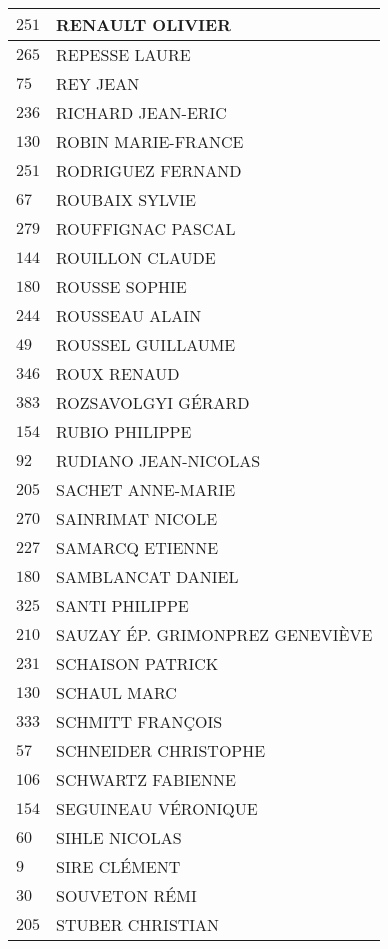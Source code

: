 \begin{xltabular}{\linewidth}{|l|X|}
    \hline
    $251$ & RENAULT OLIVIER \\
    \hline
    $265$ & REPESSE LAURE \\
    \hline
    $75$ & REY JEAN \\
    \hline
    $236$ & RICHARD JEAN-ERIC \\
    \hline
    $130$ & ROBIN MARIE-FRANCE \\
    \hline
    $251$ & RODRIGUEZ FERNAND \\
    \hline
    $67$ & ROUBAIX SYLVIE \\
    \hline
    $279$ & ROUFFIGNAC PASCAL \\
    \hline
    $144$ & ROUILLON CLAUDE \\
    \hline
    $180$ & ROUSSE SOPHIE \\
    \hline
    $244$ & ROUSSEAU ALAIN \\
    \hline
    $49$ & ROUSSEL GUILLAUME \\
    \hline
    $346$ & ROUX RENAUD \\
    \hline
    $383$ & ROZSAVOLGYI GÉRARD \\
    \hline
    $154$ & RUBIO PHILIPPE \\
    \hline
    $92$ & RUDIANO JEAN-NICOLAS \\
    \hline
    $205$ & SACHET ANNE-MARIE \\
    \hline
    $270$ & SAINRIMAT NICOLE \\
    \hline
    $227$ & SAMARCQ ETIENNE \\
    \hline
    $180$ & SAMBLANCAT DANIEL \\
    \hline
    $325$ & SANTI PHILIPPE \\
    \hline
    $210$ & SAUZAY ÉP. GRIMONPREZ GENEVIÈVE \\
    \hline
    $231$ & SCHAISON PATRICK \\
    \hline
    $130$ & SCHAUL MARC \\
    \hline
    $333$ & SCHMITT FRANÇOIS \\
    \hline
    $57$ & SCHNEIDER CHRISTOPHE \\
    \hline
    $106$ & SCHWARTZ FABIENNE \\
    \hline
    $154$ & SEGUINEAU VÉRONIQUE \\
    \hline
    $60$ & SIHLE NICOLAS \\
    \hline
    $9$ & SIRE CLÉMENT \\
    \hline
    $30$ & SOUVETON RÉMI \\
    \hline
    $205$ & STUBER CHRISTIAN \\

\end{xltabular}
